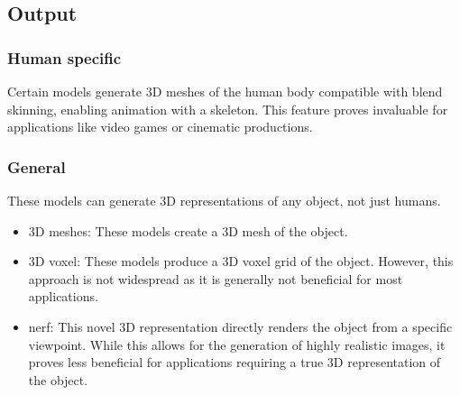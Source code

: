 \subsection{Output}

\subsubsection{Human specific}

Certain models generate 3D meshes of the human body compatible with blend
skinning, enabling animation with a skeleton. This feature proves invaluable
for applications like video games or cinematic productions.

\subsubsection{General}

These models can generate 3D representations of any object, not just humans.

\begin{itemize}
    \item 3D meshes: These models create a 3D mesh of the object.
    \item 3D voxel: These models produce a 3D voxel grid of the object. However, this approach is not widespread as it is generally not beneficial for most applications.
    \item \gls{nerf}: This novel 3D representation directly renders the object from a specific viewpoint. While this allows for the generation of highly realistic images, it proves less beneficial for applications requiring a true 3D representation of the object.
\end{itemize}